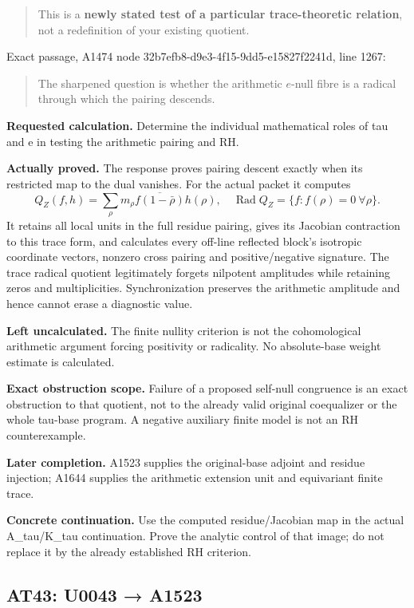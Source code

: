 \begin{quote}
This is a \textbf{newly stated test of a particular trace-theoretic
relation}, not a redefinition of your existing quotient.
\end{quote}

Exact passage, A1474 node 32b7efb8-d9e3-4f15-9dd5-e15827f2241d, line
1267:

\begin{quote}
The sharpened question is whether the arithmetic \(e\)-null fibre is a
radical through which the pairing descends.
\end{quote}

\textbf{Requested calculation.} Determine the individual mathematical
roles of tau and e in testing the arithmetic pairing and RH.

\textbf{Actually proved.} The response proves pairing descent exactly
when its restricted map to the dual vanishes. For the actual packet it
computes \[
Q_Z(f,h)=\sum_\rho m_\rho\overline{f(1-\bar\rho)}h(\rho),
\quad \operatorname{Rad}Q_Z=\{f:f(\rho)=0\ \forall\rho\}.
\] It retains all local units in the full residue pairing, gives its
Jacobian contraction to this trace form, and calculates every off-line
reflected block's isotropic coordinate vectors, nonzero cross pairing
and positive/negative signature. The trace radical quotient legitimately
forgets nilpotent amplitudes while retaining zeros and multiplicities.
Synchronization preserves the arithmetic amplitude and hence cannot
erase a diagnostic value.

\textbf{Left uncalculated.} The finite nullity criterion is not the
cohomological arithmetic argument forcing positivity or radicality. No
absolute-base weight estimate is calculated.

\textbf{Exact obstruction scope.} Failure of a proposed self-null
congruence is an exact obstruction to that quotient, not to the already
valid original coequalizer or the whole tau-base program. A negative
auxiliary finite model is not an RH counterexample.

\textbf{Later completion.} A1523 supplies the original-base adjoint and
residue injection; A1644 supplies the arithmetic extension unit and
equivariant finite trace.

\textbf{Concrete continuation.} Use the computed residue/Jacobian map in
the actual A\_tau/K\_tau continuation. Prove the analytic control of
that image; do not replace it by the already established RH criterion.

\subsection{AT43: U0043 → A1523}\label{at43-u0043-a1523}

